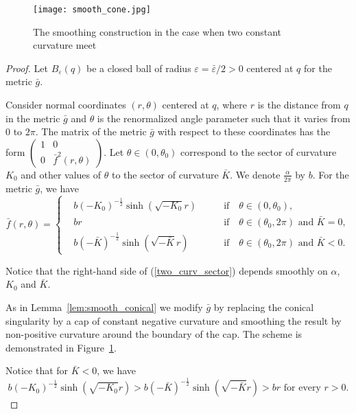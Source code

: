 \documentclass[12pt]{article}
\numberwithin{equation}{section}
\theoremstyle{definition}
\newcommand{\eps}{\varepsilon}
\begin{document}
\begin{figure}
  \centering
  \texttt{[image: smooth\_cone.jpg]}
    \caption{The smoothing construction in the case when two constant curvature meet}
    \label{fig:cone_smooth}
\end{figure}

\begin{proof}
Let $B_{\eps}(q)$ be a closed ball of radius $\eps=\bar\eps/2>0$ centered at $q$ for the metric $\bar g$. 

Consider normal coordinates $(r,\theta)$ centered at $q$, where $r$ is the distance from $q$ in the metric $\bar g$ and $\theta$ is the renormalized angle parameter such that it varies from $0$ to $2\pi$. The matrix of the metric $\bar g$ with respect to these coordinates has the form $\left(\begin{array}{cc} 1 & 0\\ 0 & \bar f^2(r, \theta)\end{array}\right)$. Let $\theta\in (0,\theta_0)$ correspond to the sector of curvature $K_0$ and other values of $\theta$ to the sector of curvature $\bar K$. We denote $\frac{\alpha}{2\pi}$ by $b$. For the metric $\bar g$, we have
\begin{equation}\label{two_curv_sector}
\bar f(r, \theta)=\left\{
  \begin{aligned}
&b(-K_0)^{-\frac{1}{2}}\sinh\left(\sqrt{-K_0}r\right) \qquad &\text{if} \quad \theta\in(0,\theta_0),\\	
&br \qquad &\text{if} \quad \theta\in(\theta_0, 2\pi) \text{ and } \bar K=0,\\ 
&b\left(-\bar K\right)^{-\frac{1}{2}}\sinh(\sqrt{-\bar K}r)\qquad &\text{if} \quad \theta\in(\theta_0, 2\pi) \text{ and } \bar K<0.
\end{aligned}
\right.
\end{equation}

Notice that the right-hand side of (\ref{two_curv_sector}) depends smoothly on $\alpha$, $K_0$ and $\bar K$.
 
As in Lemma~\ref{lem:smooth_conical} we modify $\bar g$ by replacing the conical singularity by a cap of constant negative curvature and smoothing the result by non-positive curvature around the boundary of the cap. The scheme is demonstrated in Figure~\ref{fig:cone_smooth}. 

Notice that for $\bar K < 0$, we have 
\begin{equation*}
b\left(-K_0\right)^{-\frac{1}{2}}\sinh\left(\sqrt{-K_0}r\right)>b\left(-\bar K\right)^{-\frac{1}{2}}\sinh\left(\sqrt{-\bar K}r\right)>br \text{ for every }  r>0.
\end{equation*} 


\end{proof}
\end{document}
